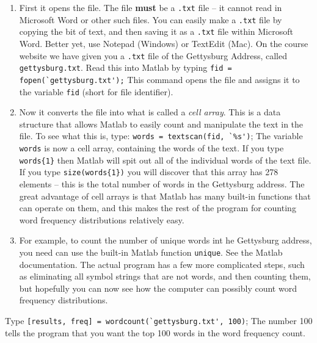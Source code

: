\documentclass[12pt]{amsart}
\begin{document}
\begin{enumerate}
\item First it opens the file.  The file \textbf{must} be a \verb+.txt+ file -- it cannot read in Microsoft Word or other such files.  You can easily make a \verb+.txt+ file by copying the bit of text, and then saving it as a \verb+.txt+ file within Microsoft Word.  Better yet, use Notepad (Windows) or TextEdit (Mac).  On the course website we have given you a \verb+.txt+ file of the Gettysburg Address, called \verb+gettysburg.txt+.  Read this into Matlab by typing  
\verb+fid = fopen(`gettysburg.txt');+
This command opens the file and assigns it to the variable \verb+fid+ (short for file identifier).\\
\item Now it converts the file into what is called a \textit{cell array}.  This is a data structure that allows Matlab to easily count and manipulate the text in the file.    To see what this is, type:
\verb+words = textscan(fid, `%s')+;
The variable \verb+words+ is now a cell array, containing the words of the text.  If you type
\verb+words{1}+
then Matlab will spit out all of the individual words of the text file.  If you type
\verb+size(words{1})+
you will discover that this array has 278 elements -- this is the total number of words in the Gettysburg address.  The great advantage of cell arrays is that Matlab has many built-in functions that can operate on them, and this makes the rest of the program for counting word frequency distributions relatively easy.\\
\item For example, to count the number of unique words int he Gettysburg address, you need can use the built-in Matlab function \verb+unique+.  See the Matlab documentation.  %
The actual program has a few more complicated steps, such as eliminating all symbol strings that are not words, and then counting them, but hopefully you can now see how the computer can possibly count word frequency distributions.\\
\end{enumerate}

\noindent Type
\verb+[results, freq] = wordcount(`gettysburg.txt', 100)+;
The number 100 tells the program that you want the top 100 words in the word frequency count.
\end{document}
